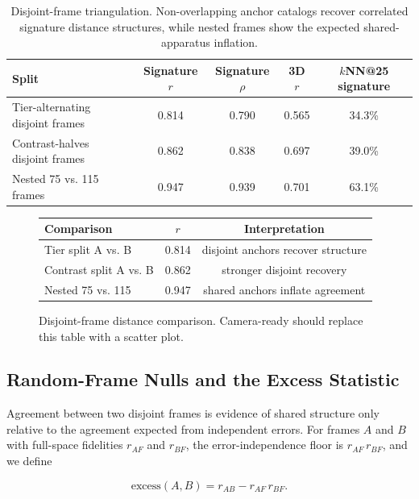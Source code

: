 \documentclass[11pt]{article}
\begin{document}
\begin{table}[t]
\centering
\small
\begin{tabular}{@{}lcccc@{}}
\toprule
Split & Signature $r$ & Signature $\rho$ & 3D $r$ & $k$NN@25 signature \\
\midrule
Tier-alternating disjoint frames & 0.814 & 0.790 & 0.565 & 34.3\% \\
Contrast-halves disjoint frames & 0.862 & 0.838 & 0.697 & 39.0\% \\
Nested 75 vs. 115 frames & 0.947 & 0.939 & 0.701 & 63.1\% \\
\bottomrule
\end{tabular}
\caption{Disjoint-frame triangulation. Non-overlapping anchor catalogs recover correlated signature distance structures, while nested frames show the expected shared-apparatus inflation.}
\label{tab:disjoint}
\end{table}

\begin{figure}[t]
\centering
\footnotesize
\begin{tabularx}{\columnwidth}{@{}Ycc@{}}
\toprule
Comparison & $r$ & Interpretation \\
\midrule
Tier split A vs. B & 0.814 & disjoint anchors recover structure \\
Contrast split A vs. B & 0.862 & stronger disjoint recovery \\
Nested 75 vs. 115 & 0.947 & shared anchors inflate agreement \\
\bottomrule
\end{tabularx}
\caption{Disjoint-frame distance comparison. Camera-ready should replace this table with a scatter plot.}
\label{fig:disjoint-scatter}
\end{figure}

\subsection{Random-Frame Nulls and the Excess Statistic}
\label{sec:excess}

Agreement between two disjoint frames is evidence of shared structure only relative to the agreement expected from independent errors. For frames $A$ and $B$ with full-space fidelities $r_{AF}$ and $r_{BF}$, the error-independence floor is $r_{AF}\,r_{BF}$, and we define

\begin{equation}
\mathrm{excess}(A,B)=r_{AB}-r_{AF}\,r_{BF}.
\end{equation}
\end{document}
